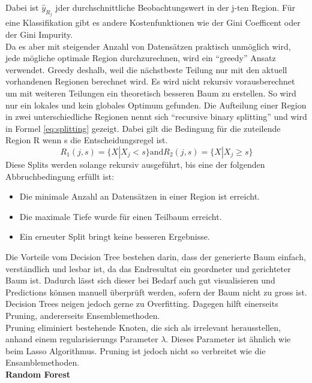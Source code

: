 %
\newline
Dabei ist $\hat{y}_{R_j}$ jder durchschnittliche Beobachtungswert in der j-ten Region.
Für eine Klassifikation gibt es andere Kostenfunktionen wie der Gini Coefficent oder der Gini Impurity.\\
Da es aber mit steigender Anzahl von Datensätzen praktisch unmöglich wird, jede mögliche optimale Region durchzurechnen, wird ein “greedy” Ansatz verwendet. Greedy deshalb, weil die nächstbeste Teilung nur mit den aktuell vorhandenen Regionen berechnet wird. Es wird nicht rekursiv vorausberechnet um mit weiteren Teilungen ein theoretisch besseren Baum zu erstellen. So wird nur ein lokales und kein globales Optimum gefunden. Die Aufteilung einer Region in zwei unterschiedliche Regionen nennt sich “recursive binary splitting” und wird in Formel \eqref{eq:splitting} gezeigt. Dabei gilt die Bedingung für die zuteilende Region R wenn s die Entscheidungsregel ist.
%
\begin{equation}
\label{eq:splitting}
R_1(j,s) = \{X|X_j < s\} \text{and} R_2(j,s) = \{X|X_j \geq s\}
\end{equation}
%
\newline
Diese Splits werden solange rekursiv ausgeführt, bis eine der folgenden Abbruchbedingung erfüllt ist:
\begin{itemize}
\item Die minimale Anzahl an Datensätzen in einer Region ist erreicht.
\item Die maximale Tiefe wurde für einen Teilbaum erreicht.
\item Ein erneuter Split bringt keine besseren Ergebnisse.
\end{itemize}
Die Vorteile vom Decision Tree bestehen darin, dass der generierte Baum einfach, verständlich und lesbar ist, da das Endresultat ein geordneter und gerichteter Baum ist. Dadurch lässt sich dieser bei Bedarf auch gut visualisieren und Predictions können manuell überprüft werden, sofern der Baum nicht zu gross ist.\\
Decision Trees neigen jedoch gerne zu Overfitting. Dagegen hilft einerseits Pruning, andererseits Ensemblemethoden.\\
Pruning eliminiert bestehende Knoten, die sich als irrelevant herausstellen, anhand einem regularisierungs Parameter $\lambda$. Dieses Parameter ist ähnlich wie beim Lasso Algorithmus. Pruning ist jedoch nicht so verbreitet wie die Ensamblemethoden.\\[2ex]
%
\textbf{Random Forest}\\
